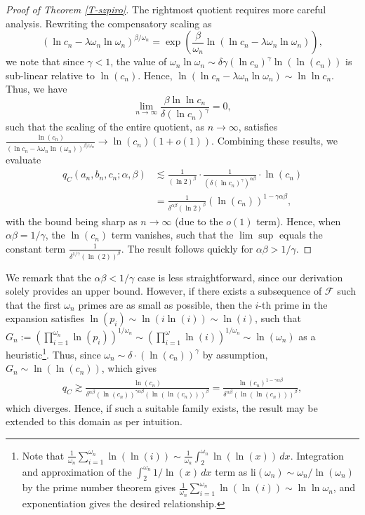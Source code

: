 \documentclass[11pt,letterpaper]{amsart}
\def\ra{\rightarrow}
\begin{document}
\begin{proof}[Proof of Theorem \ref{T-szpiro}]
The rightmost quotient requires more careful analysis. Rewriting the compensatory scaling as
\[
    (\ln c_n - \lambda \omega_n \ln \omega_n)^{\beta/\omega_n} = \exp\left( \frac{\beta}{\omega_n} \ln(\ln c_n - \lambda \omega_n \ln \omega_n) \right),
\]
we note that since $\gamma < 1$, the value of $\omega_n \ln \omega_n \sim \delta \gamma (\ln c_n)^\gamma \ln(\ln(c_n))$ is sub-linear relative to $\ln(c_n)$. Hence, $\ln(\ln c_n - \lambda \omega_n \ln \omega_n) \sim \ln \ln c_n$. Thus, we have
\[
    \lim_{n \to \infty} \frac{\beta \ln \ln c_n}{\delta (\ln c_n)^\gamma} = 0,
\]
such that the scaling of the entire quotient, as $n \ra \infty$, satisfies $\frac{\ln (c_n)}{(\ln c_n - \lambda \omega_n \ln (\omega_n))^{\beta/\omega_n}} \ra \ln(c_n) (1 + o(1))$. Combining these results, we evaluate
\begin{align*}
    q_C(a_n, b_n, c_n; \alpha, \beta) &\lesssim \frac{1}{(\ln 2)^\beta} \cdot \frac{1}{(\delta (\ln c_n)^\gamma)^{\alpha\beta}} \cdot \ln (c_n) \\ &= \frac{1}{\delta^{\alpha\beta} (\ln 2)^\beta} (\ln (c_n))^{1 - \gamma \alpha \beta},
\end{align*}
with the bound being sharp as $n \ra \infty$ (due to the $o(1)$ term). Hence, when $\alpha \beta = 1/\gamma$, the $\ln(c_n)$ term vanishes, such that the $\lim\sup$ equals the constant term $\frac{1}{\delta^{1/\gamma} (\ln(2))^{\beta}}$. The result follows quickly for $\alpha \beta > 1/\gamma$.
\end{proof}
We remark that the $\alpha \beta < 1/\gamma$ case is less straightforward, since our derivation solely provides an upper bound. However, if there exists a subsequence of $\mathcal{F}$ such that the first $\omega_n$ primes are as small as possible, then the $i$-th prime in the expansion satisfies $\ln(p_i) \sim \ln(i \ln(i)) \sim \ln(i)$, such that $G_n := \left(\prod_{i = 1}^{\omega_n} \ln(p_i) \right)^{1/\omega_n} \sim \left( \prod_{i = 1}^{\omega} \ln(i)\right)^{1/\omega_n} \sim \ln(\omega_n)$ as a heuristic\footnote{Note that $\frac{1}{\omega_n} \sum_{i = 1}^{\omega_n} \ln(\ln(i)) \sim \frac{1}{\omega_n} \int_2^{\omega_n} \ln(\ln(x)) \, dx$. Integration and approximation of the $\int_2^{\omega_n} 1/\ln(x) \, dx$ term as $\mathrm{li}(\omega_n)\sim \omega_n/\ln(\omega_n)$ by the prime number theorem gives $\frac{1}{\omega_n} \sum_{i = 1}^{\omega_n} \ln(\ln(i)) \sim \ln \ln \omega_n$, and exponentiation gives the desired relationship.}. Thus, since $\omega_n \sim \delta \cdot (\ln(c_n))^{\gamma}$ by assumption, $G_n \sim \ln(\ln(c_n))$, which gives
\begin{align*}
    q_C \gtrsim \frac{\ln(c_n)}{\delta^{\alpha \beta} (\ln(c_n))^{\gamma \alpha \beta} (\ln(\ln(c_n)))^{\beta}} = \frac{\ln(c_n)^{1 - \gamma \alpha \beta}}{\delta^{\alpha \beta} (\ln(\ln(c_n)))^{\beta}},
\end{align*}
which diverges. Hence, if such a suitable family exists, the result may be extended to this domain as per intuition.
\end{document}
